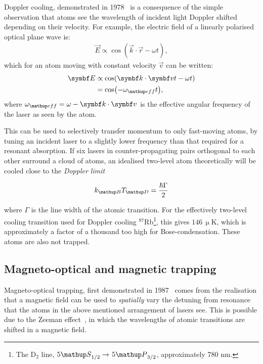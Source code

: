 Doppler cooling, demonstrated in 1978~\cite{wineland_radiation-pressure_1978} is a consequence of the simple observation that atoms see the wavelength of incident light Doppler shifted depending on their velocity. For example, the electric field of a linearly polarised optical plane wave is:
\begin{align}
\vec E \propto \cos(\vec k \cdot \vec r - \omega t),
\end{align}
which for an atom moving with constant velocity $\vec v$ can be written:
\begin{align}
\vec E &\propto \cos(\vec k \cdot \vec v t - \omega t)\\
&= \cos(- \omega_\up{eff} t),
\end{align}
where $\omega_\up{eff} = \omega - \vec k \cdot \vec v$ is the effective angular frequency of the laser as seen by the atom.

This can be used to selectively transfer momentum to only fast-moving atoms, by tuning an incident laser to a slightly lower frequency than that required for a resonant absorption. If six lasers in counter-propagating pairs orthogonal to each other surround a cloud of atoms, an idealised two-level atom theoretically will be cooled close to the \emph{Doppler limit}~\cite[p 58]{metcalf_laser_1999}

\begin{equation}
k_\up{B} T_\up{D} = \frac{\hbar\Gamma}2
\end{equation}

where $\Gamma$ is the line width of the atomic transition. For the effectively two-level cooling transition used for Doppler cooling $^{87}$Rb\footnote{The D$_2$ line, $5\up{S}_{1/2}\rightarrow$ $5\up{P}_{3/2}$, approximately 780 nm.}, this gives $146\,\upmu$K, which is approximately a factor of a thousand too high for Bose-condensation. These atoms are also not trapped.

\subsection{Magneto-optical and magnetic trapping}

Magneto-optical trapping, first demonstrated in 1987~\cite{raab_trapping_1987} comes from the realisation that a magnetic field can be used to \emph{spatially} vary the detuning from resonance that the atoms in the above mentioned arrangement of lasers see. This is possible due to the Zeeman effect~\cite{zeeman_influence_1897}, in which the wavelengths of atomic transitions are shifted in a magnetic field.

